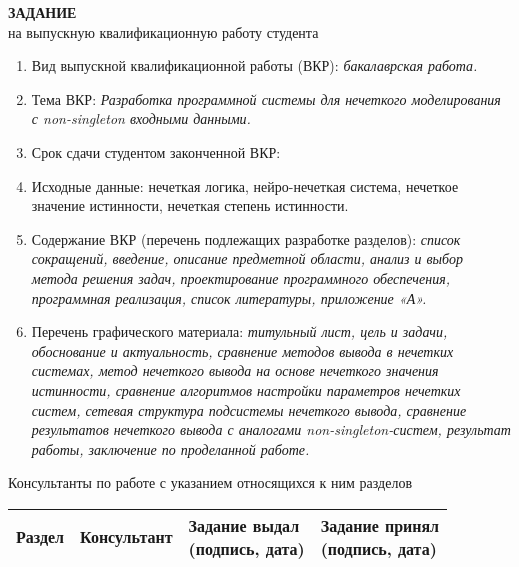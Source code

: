 \vspace{1cm}

\begin{center}
	\textbf{ЗАДАНИЕ}\\[0.1em]
	на выпускную квалификационную работу студента\\
\end{center}

\begin{footnotesize}%
	\begin{enumerate}[label=\arabic*.]
		\item Вид выпускной квалификационной работы (ВКР): \textit{бакалаврская работа.}
		\item Тема ВКР: \textit{Разработка программной системы для нечеткого моделирования с non-singleton входными данными.}
		\item Срок сдачи студентом законченной ВКР:
		\item Исходные данные: нечеткая логика, нейро-нечеткая система, нечеткое значение истинности, нечеткая степень истинности.
		\item Содержание ВКР (перечень подлежащих разработке разделов): \textit{список сокращений, введение, описание предметной области, анализ и выбор метода решения задач, проектирование программного обеспечения, программная реализация, список литературы, приложение «А».}
		\item Перечень графического материала: \textit{титульный лист, цель и задачи, обоснование и актуальность, сравнение методов вывода в нечетких системах, метод нечеткого вывода на основе нечеткого значения истинности, сравнение алгоритмов настройки параметров нечетких систем, сетевая структура подсистемы нечеткого вывода, сравнение результатов нечеткого вывода с аналогами non-singleton-систем, результат работы, заключение по проделанной работе.}
	\end{enumerate}
\end{footnotesize}

\newpage
{}

Консультанты по работе с указанием относящихся к ним разделов

\begin{center}
	\setlength\tabcolsep{4pt}
	\begin{tabular}{|p{4cm}|p{3cm}|p{4cm}|p{4cm}|}
		\hline
		\centering Раздел      &
		\centering Консультант &
		\makecell[c]{Задание выдал  \\\footnotesize(подпись, дата)} &
		\makecell[c]{Задание принял \\\footnotesize(подпись, дата)} \\ \hline
	\end{tabular}
\end{center}

